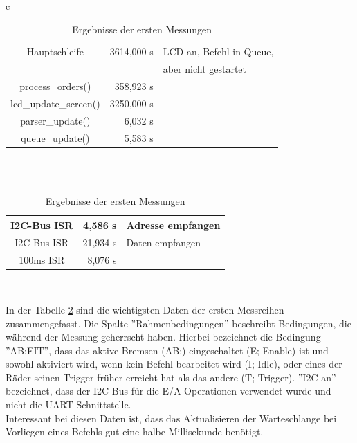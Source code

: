 \begin{table}[htb]
\begin{center}
\begin{tabular}{c}
\begin{tabularx}{\textwidth}{|c||r|X|}
		\hline
		Hauptschleife & 3614,000 \textmu{}s & LCD an, Befehl in Queue, \\
		& & aber nicht gestartet \\ \hline
		process\_orders() & 358,923 \textmu{}s &  \\ \hline
		lcd\_update\_screen() & 3250,000 \textmu{}s &  \\ \hline
		parser\_update() & 6,032 \textmu{}s &  \\ \hline
		queue\_update() & 5,583 \textmu{}s &  \\ \hline
	\end{tabularx} \\
	\\
	\begin{tabularx}{\textwidth}{|c||r|X|}
		\hline
		I2C-Bus ISR & 4,586 \textmu{}s & Adresse empfangen \\ \hline
		I2C-Bus ISR & 21,934 \textmu{}s & Daten empfangen \\ \hline
		100ms ISR & 8,076 \textmu{}s & \\ \hline
	\end{tabularx} \\
	\end{tabular}
	\caption{\label{erste_messung} Ergebnisse der ersten Messungen}
\end{center}
\end{table}
In der Tabelle \ref{erste_messung} sind die wichtigsten Daten der ersten Messreihen zusammengefasst.
Die Spalte ''Rahmenbedingungen'' beschreibt Bedingungen, die während der Messung geherrscht haben.
Hierbei bezeichnet die Bedingung ''AB:EIT'', dass das aktive Bremsen (AB:) eingeschaltet (E; Enable) ist und
sowohl aktiviert wird, wenn kein Befehl bearbeitet wird (I; Idle), oder eines der Räder seinen Trigger früher
erreicht hat als das andere (T; Trigger). ''I2C an'' bezeichnet, dass der I2C-Bus für die E/A-Operationen
verwendet wurde und nicht die UART-Schnittstelle.\\
Interessant bei diesen Daten ist, dass das Aktualisieren der Warteschlange bei Vorliegen eines Befehls gut
eine halbe Millisekunde benötigt.

